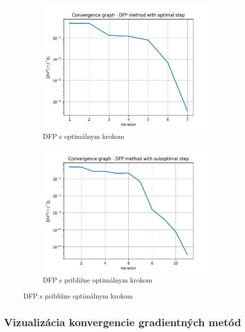 \documentclass[report.tex]{subfiles}
\begin{document}
\begin{figure}[h!]
	\begin{subfigure}[b]{0.4\linewidth}
		\includegraphics[width=\linewidth]{../../source/solvency_log_reg_results/DFP_optimal.png}
		\caption{DFP s optimálnym krokom}
	\end{subfigure}
	\begin{subfigure}[b]{0.4\linewidth}
		\includegraphics[width=\linewidth]{../../source/solvency_log_reg_results/DFP_suboptimal.png}
		\caption{DFP s približne optimálnym krokom}
	\end{subfigure}
	\label{fig:quasinewton}
\end{figure}

\newpage

\subsection{Vizualizácia konvergencie gradientných metód}
\end{document}
